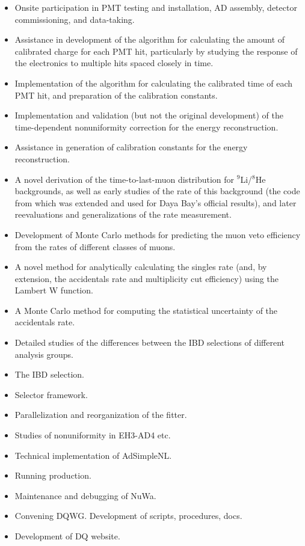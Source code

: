 \begin{itemize}
\item Onsite participation in PMT testing and installation, AD assembly, detector commissioning, and data-taking.
\item Assistance in development of the algorithm for calculating the amount of calibrated charge for each PMT hit, particularly by studying the response of the electronics to multiple hits spaced closely in time.
\item Implementation of the algorithm for calculating the calibrated time of each PMT hit, and preparation of the calibration constants.
\item Implementation and validation (but not the original development) of the time-dependent nonuniformity correction for the energy reconstruction.
\item Assistance in generation of calibration constants for the energy reconstruction.
\item A novel derivation of the time-to-last-muon distribution for $^9$Li/$^8$He backgrounds, as well as early studies of the rate of this background (the code from which was extended and used for Daya Bay's official results), and later reevaluations and generalizations of the rate measurement.
\item Development of Monte Carlo methods for predicting the muon veto efficiency from the rates of different classes of muons.
\item A novel method for analytically calculating the singles rate (and, by extension, the accidentals rate and multiplicity cut efficiency) using the Lambert W function.
\item A Monte Carlo method for computing the statistical uncertainty of the accidentals rate.
\item Detailed studies of the differences between the IBD selections of different analysis groups.
\item The IBD selection.
\item Selector framework.
\item Parallelization and reorganization of the fitter.
\item Studies of nonuniformity in EH3-AD4 etc.
\item Technical implementation of AdSimpleNL.
\item Running production.
\item Maintenance and debugging of NuWa.
\item Convening DQWG. Development of scripts, procedures, docs.
\item Development of DQ website.

\end{itemize}
